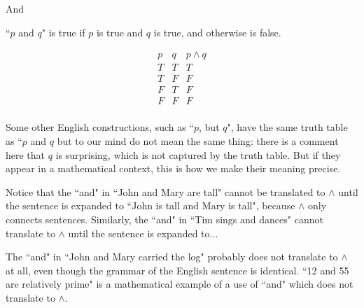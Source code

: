 \documentclass{slides}
\begin{document}
\begin{slide}

{\Large And}

``$p$ and $q$" is true if $p$ is true and $q$ is true, and otherwise is false.

$$\begin{array}{cc|c}

p & q & p \wedge q \\ \hline
T & T & T\\
T & F & F\\
F & T & F\\
F & F & F\\
\end{array}$$

Some other English constructions, such as ``$p$, but $q$", have the same truth table as ``$p$ and $q$ but to our mind do not mean the same thing: there is a comment here that $q$ is surprising, which is not captured by the truth table.  But if they appear in a mathematical context, this is how we make their meaning precise.

\end{slide}

\begin{slide}

Notice that the ``and" in ``John and Mary are tall" cannot be translated to $\wedge$ until the sentence is expanded to
``John is tall and Mary is tall",  because $\wedge$ only connects sentences.  Similarly, the ``and" in ``Tim sings and dances" cannot translate to $\wedge$ until the sentence is expanded to$\ldots$

The ``and" in ``John and Mary carried the log" probably does not translate to $\wedge$ at all, even though the grammar of the English sentence is identical.  ``12 and 55 are relatively prime" is a mathematical example of a use of ``and" which does not translate to $\wedge$.


\end{slide}
\end{document}
